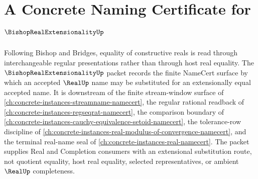 \chapter{A Concrete Naming Certificate for $\BishopRealExtensionalityUp$}
\label{ch:concrete-instances-bishop-real-extensionality-namecert}

Following Bishop and Bridges, equality of constructive reals is read through interchangeable regular presentations rather than through host real equality. The $\BishopRealExtensionalityUp$ packet records the finite NameCert surface by which an accepted $\RealUp$ name may be substituted for an extensionally equal accepted name. It is downstream of the finite stream-window surface of \autoref{ch:concrete-instances-streamname-namecert}, the regular rational readback of \autoref{ch:concrete-instances-regseqrat-namecert}, the comparison boundary of \autoref{ch:concrete-instances-cauchy-equivalence-setoid-namecert}, the tolerance-row discipline of \autoref{ch:concrete-instances-real-modulus-of-convergence-namecert}, and the terminal real-name seal of \autoref{ch:concrete-instances-real-namecert}. The packet supplies Real and Completion consumers with an extensional substitution route, not quotient equality, host real equality, selected representatives, or ambient $\RealUp$ completeness.

